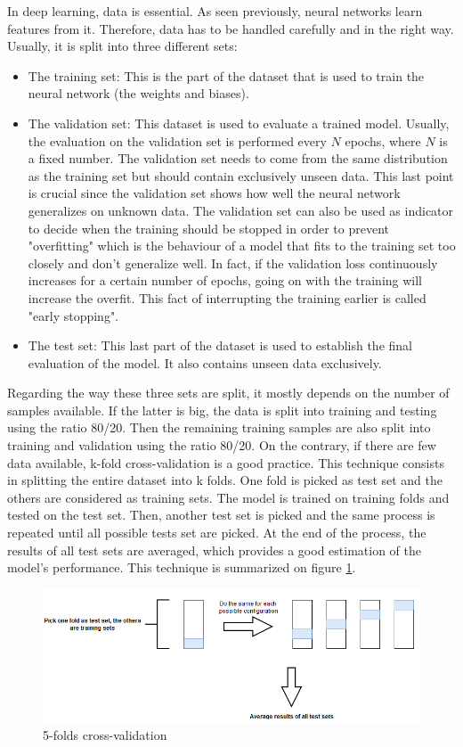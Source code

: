 \setlength{\marginparwidth}{3cm}\leavevmode {}In deep learning, data is essential. As seen previously, neural networks learn features from it. Therefore, data has to be handled carefully and in the right way. Usually, it is split into three different sets:
\begin{itemize}
\item The training set: This is the part of the dataset that is used to train the neural network (the weights and biases).
\item The validation set: This dataset is used to evaluate a trained model. Usually, the evaluation on the validation set is performed every $N$ epochs, where $N$ is a fixed number. The validation set needs to come from the same distribution as the training set but should contain exclusively unseen data. This last point is crucial since the validation set shows how well the neural network generalizes on unknown data. The validation set can also be used as indicator to decide when the training should be stopped in order to prevent "overfitting" which is the behaviour of a model that fits to the training set too closely and don't generalize well. In fact, if the validation loss continuously increases for a certain number of epochs, going on with the training will increase the overfit. This fact of interrupting the training earlier is called "early stopping".
\item The test set: This last part of the dataset is used to establish the final evaluation of the model. It also contains unseen data exclusively. 
\end{itemize}
Regarding the way these three sets are split, it mostly depends on the number of samples available. If the latter is big, the data is split into training and testing using the ratio 80/20. Then the remaining training samples are also split into training and validation using the ratio 80/20. On the contrary, if there are few data available, k-fold cross-validation is a good practice. This technique consists in splitting the entire dataset into k folds. One fold is picked as test set and the others are considered as training sets. The model is trained on training folds and tested on the test set. Then, another test set is picked and the same process is repeated until all possible tests set are picked. At the end of the process, the results of all test sets are averaged, which provides a good estimation of the model's performance. This technique is summarized on figure \ref{cross_validation}.

\begin{figure}[!h]
\centering
\includegraphics[width=1\textwidth, keepaspectratio=true]{./figures/cross_validation.png}
\caption{5-folds cross-validation }
\label{cross_validation}
\end{figure}


